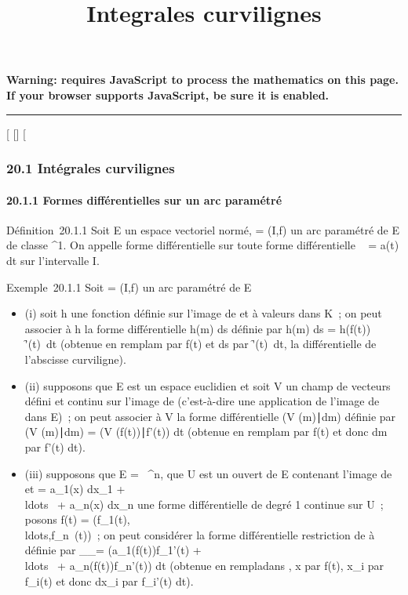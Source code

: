 \documentclass[]{article}
\title{Integrales curvilignes}
\author{}
\date{}
\begin{document}
\maketitle

\textbf{Warning: 
requires JavaScript to process the mathematics on this page.\\ If your
browser supports JavaScript, be sure it is enabled.}

\begin{center}\rule{3in}{0.4pt}\end{center}

{[}
{[}{]}
{[}

\subsubsection{20.1 Intégrales curvilignes}

\paragraph{20.1.1 Formes différentielles sur un arc paramétré}

Définition~20.1.1 Soit E un espace vectoriel normé, \Gamma = (I,f) un arc
paramétré de E de classe ^1. On appelle forme différentielle
sur \Gamma toute forme différentielle \alpha~ = a(t) dt sur l'intervalle I.

Exemple~20.1.1 Soit \Gamma = (I,f) un arc paramétré de E

\begin{itemize}
\itemsep1pt\parskip0pt
\item
  (i) soit h une fonction définie sur l'image de \Gamma et à valeurs dans K~;
  on peut associer à h la forme différentielle h(m) ds définie par h(m)
  ds = h(f(t)) \f'(t)\
  dt (obtenue en rempla\ccant m par f(t) et ds par
  \f'(t)\ dt, la
  différentielle de l'abscisse curviligne).
\item
  (ii) supposons que E est un espace euclidien et soit V un champ de
  vecteurs défini et continu sur l'image de \Gamma (c'est-à-dire une
  application de l'image de \Gamma dans E)~; on peut associer à V la forme
  différentielle (V (m)∣dm) définie par (V
  (m)∣dm) = \left (V
  (f(t))∣f'(t)\right ) dt
  (obtenue en rempla\ccant m par f(t) et donc dm par
  f'(t) dt).
\item
  (iii) supposons que E = ~^n, que U est un ouvert de E
  contenant l'image de \Gamma et \omega = a_1(x) dx_1 +
  \\ldots~ +
  a_n(x) dx_n une forme différentielle de degré 1
  continue sur U~; posons f(t) =
  (f_1(t),\\ldots,f_n~(t))~;
  on peut considérer la forme différentielle restriction de \omega à \Gamma
  définie par \omega__\Gamma = \left
  (a_1(f(t))f_1'(t) +
  \\ldots~ +
  a_n(f(t))f_n'(t)\right ) dt (obtenue
  en rempla\ccant dans \omega, x par f(t), x_i
  par f_i(t) et donc dx_i par f_i'(t) dt).
\end{itemize}
\end{document}
